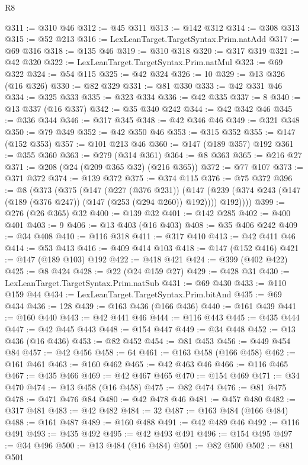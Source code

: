 \begin{lexlean}{R8}
\begin{coremodule}
@311 := @310 @46
@312 := @45 @311
@313 := @142 @312
@314 := @308 @313
@315 := @52 @213
@316 := LexLeanTarget.TargetSyntax.Prim.natAdd
@317 := @69 @316
@318 := @135 @46
@319 := @310 @318
@320 := @317 @319
@321 := @42 @320
@322 := LexLeanTarget.TargetSyntax.Prim.natMul
@323 := @69 @322
@324 := @54 @115
@325 := @42 @324
@326 := 10
@329 := @13 @326 (@16 @326)
@330 := @82 @329
@331 := @81 @330
@333 := @42 @331 @46
@334 := @325 @333
@335 := @323 @334
@336 := @42 @335
@337 := 8
@340 := @13 @337 (@16 @337)
@342 := @35 @340 @242
@344 := @42 @342 @46
@345 := @336 @344
@346 := @317 @345
@348 := @42 @346 @46
@349 := @321 @348
@350 := @79 @349
@352 := @42 @350 @46
@353 := @315 @352
@355 := @147 (@152 @353)
@357 := @101 @213 @46
@360 := @147 (@189 @357) @192
@361 := @355 @360
@363 := @279 (@314 @361)
@364 := @8 @363
@365 := @216 @27
@371 := @208 (@24 (@209 @365 @32) (@216 @365))
@372 := @77 @107
@373 := @371 @372
@374 := @139 @372
@375 := @374 @115
@376 := @75 @372
@396 := @8
    (@373
      (@375
        (@147
          (@227 (@376 @231))
          (@147 (@239 (@374 @243 (@147 (@189 (@376 @247)) (@147 (@253 (@294 @260)) @192)))) @192))))
@399 := @276 (@26 @365) @32
@400 := @139 @32
@401 := @142 @285
@402 := @400 @401
@403 := 9
@406 := @13 @403 (@16 @403)
@408 := @35 @406 @242
@409 := @34 @408
@410 := @116 @318
@411 := @317 @410
@413 := @42 @411 @46
@414 := @53 @413
@416 := @409 @414 @103
@418 := @147 (@152 @416)
@421 := @147 (@189 @103) @192
@422 := @418 @421
@424 := @399 (@402 @422)
@425 := @8 @424
@428 := @22 (@24 @159 @27)
@429 := @428 @31
@430 := LexLeanTarget.TargetSyntax.Prim.natSub
@431 := @69 @430
@433 := @110 @159 @44
@434 := LexLeanTarget.TargetSyntax.Prim.bitAnd
@435 := @69 @434
@436 := 128
@439 := @163 @436 (@166 @436)
@440 := @161 @439
@441 := @160 @440
@443 := @42 @441 @46
@444 := @116 @443
@445 := @435 @444
@447 := @42 @445 @443
@448 := @154 @447
@449 := @34 @448
@452 := @13 @436 (@16 @436)
@453 := @82 @452
@454 := @81 @453
@456 := @449 @454 @84
@457 := @42 @456
@458 := 64
@461 := @163 @458 (@166 @458)
@462 := @161 @461
@463 := @160 @462
@465 := @42 @463 @46
@466 := @116 @465
@467 := @435 @466
@469 := @42 @467 @465
@470 := @154 @469
@471 := @34 @470
@474 := @13 @458 (@16 @458)
@475 := @82 @474
@476 := @81 @475
@478 := @471 @476 @84
@480 := @42 @478 @46
@481 := @457 @480
@482 := @317 @481
@483 := @42 @482
@484 := 32
@487 := @163 @484 (@166 @484)
@488 := @161 @487
@489 := @160 @488
@491 := @42 @489 @46
@492 := @116 @491
@493 := @435 @492
@495 := @42 @493 @491
@496 := @154 @495
@497 := @34 @496
@500 := @13 @484 (@16 @484)
@501 := @82 @500
@502 := @81 @501

\end{coremodule}
\end{lexlean}
